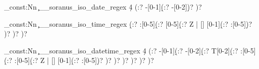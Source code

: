 %
%
%
% 
%

%
%

\regex_const:Nn \c__soranus_iso_date_regex
  {
    \A %
      \d{4} %
      (:?
        -[0-1]\d %
        (:?
          -[0-2]\d %
        )?
      )?
    \Z %
  }

\regex_const:Nn \c__soranus_iso_time_regex
  {
    \A
      [0-2]\d %
      (:?
        :[0-5]\d %
        (:?
          [0-5]\d %
          (:?
            Z | %
            [\+\-\−] %
            [0-1]\d %
            (:?
              :[0-5]\d %
            )?
          )?
        )?
      )?
    \Z
  }

\regex_const:Nn \c__soranus_iso_datetime_regex
  {
    \A %
      \d{4} %
      (:?
        -[0-1]\d %
        (:?
          -[0-2]\d %
          (:?
            T[0-2]\d %
            (:?
              :[0-5]\d %
              (:?
                :[0-5]\d %
                (:?
                  Z | %
                  [\+\-\−] %
                  [0-1]\d %
                  (:?
                    :[0-5]\d %
                  )?
                )?
              )?
            )?
          )?
        )?
      )?
    \Z %
  }
